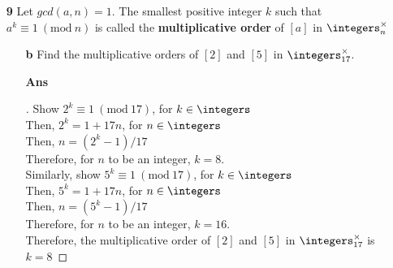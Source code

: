 \documentclass[paper=usletter, fontsize=12pt]{article}
\newcommand{\Mod}[1]{\ (\mathrm{mod}\ #1)}
\begin{document}
\begin{itemize}
\begin{itemize}
            \item[\textbf{9}] Let $gcd(a, n)=1$. The smallest positive integer $k$
            such that $a^k \equiv 1 \Mod{n}$ is called the
            \textbf{multiplicative order} of $[a]$ in $\integers_n^\times$
            \begin{itemize}

                \item[\textbf{b}] Find the multiplicative orders of $[2]$ and
                $[5]$ in $\integers_{17}^\times$.
                \item[\textbf{Ans}]
                \begin{proof}[\unskip\nopunct]

                    Show $2^k \equiv 1 \Mod{17}$, for $k \in \integers$\\
                    Then, $2^k = 1 + 17n$, for $n \in \integers$\\
                    Then, $n = (2^k-1)/17$\\
                    Therefore, for $n$ to be an integer, $k = 8$.\\

                    Similarly, show $5^k \equiv 1 \Mod{17}$, for $k \in \integers$\\
                    Then, $5^k = 1 + 17n$, for $n \in \integers$\\
                    Then, $n = (5^k-1)/17$\\
                    Therefore, for $n$ to be an integer, $k = 16$.\\

                    Therefore, the multiplicative order of $[2]$ and $[5]$ in $\integers_{17}^\times$ is $k=8$ \qedhere

                \end{proof}
                \vspace{0.2in}

            \end{itemize}


\end{itemize}
\end{itemize}
\end{document}
